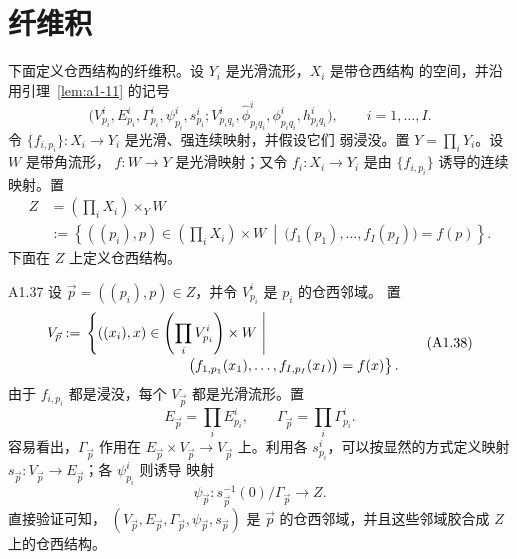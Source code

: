
\section{纤维积}
\label{sec:a1-2}

下面定义仓西结构的纤维积。设 $Y_i$ 是光滑流形，$X_i$ 是带仓西结构
的空间，并沿用引理~\ref{lem:a1-11} 的记号
\[
 \bigl(V_{p_i}^i,E_{p_i}^i,\Gamma_{p_i}^i,\psi_{p_i}^i,s_{p_i}^i;
 V_{p_iq_i}^i,\widehat\phi_{p_iq_i}^i,
 \phi_{p_iq_i}^i,h_{p_iq_i}^i\bigr),
 \qquad i=1,\ldots,I.
\]
令 $\{f_{i,p_i}\}\colon X_i\to Y_i$ 是光滑、强连续映射，并假设它们
弱浸没。置 $Y=\prod_iY_i$。设 $W$ 是带角流形，
$f\colon W\to Y$ 是光滑映射；又令 $f_i\colon X_i\to Y_i$ 是由
$\{f_{i,p_i}\}$ 诱导的连续映射。置
\begin{equation}
\begin{aligned}
 Z
 &=\left(\prod_iX_i\right)\times_YW
 \\
 &:=\left\{((p_i),p)\in\left(\prod_iX_i\right)\times W\ \middle|\
 \bigl(f_1(p_1),\ldots,f_I(p_I)\bigr)=f(p)\right\}.
\end{aligned}
\tag{A1.36}\label{eq:a1-36}
\end{equation}
下面在 $Z$ 上定义仓西结构。

\begin{definition}{A1.37}\label{def:a1-37}
设 $\vec p=((p_i),p)\in Z$，并令 $V_{p_i}^i$ 是 $p_i$ 的仓西邻域。
置
\begin{equation}
\begin{aligned}
 V_{\vec p}:={}&\left\{((x_i),x)\in
 \left(\prod_iV_{p_i}^i\right)\times W\ \middle|\right.\\[-0.2em]
 &\hspace{7.2em}\left.
 \bigl(f_{1,p_1}(x_1),\ldots,f_{I,p_I}(x_I)\bigr)=f(x)
 \right\}.
\end{aligned}
\tag{A1.38}\label{eq:a1-38}
\end{equation}
由于 $f_{i,p_i}$ 都是浸没，每个 $V_{\vec p}$ 都是光滑流形。置
\[
 E_{\vec p}=\prod_iE_{p_i}^i,
 \qquad
 \Gamma_{\vec p}=\prod_i\Gamma_{p_i}^i.
\]
容易看出，$\Gamma_{\vec p}$ 作用在
$E_{\vec p}\times V_{\vec p}\to V_{\vec p}$ 上。利用各
$s_{p_i}^i$，可以按显然的方式定义映射
$s_{\vec p}\colon V_{\vec p}\to E_{\vec p}$；各 $\psi_{p_i}^i$ 则诱导
映射
\[
 \psi_{\vec p}\colon s_{\vec p}^{-1}(0)/\Gamma_{\vec p}\longrightarrow Z.
\]
直接验证可知，
$(V_{\vec p},E_{\vec p},\Gamma_{\vec p},\psi_{\vec p},s_{\vec p})$
是 $\vec p$ 的仓西邻域，并且这些邻域胶合成 $Z$ 上的仓西结构。
\end{definition}

